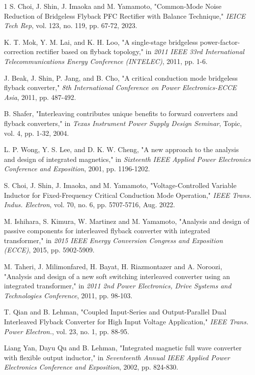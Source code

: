 \documentclass[lettersize,journal]{IEEEtran}
\begin{document}
\begin{thebibliography}{1}
S. Choi, J. Shin, J. Imaoka and M. Yamamoto, "Common-Mode Noise Reduction of Bridgeless Flyback PFC Rectifier with Balance Technique," \textit{IEICE Tech Rep}, vol. 123, no. 119, pp. 67-72, 2023.

K. T. Mok, Y. M. Lai, and K. H. Loo, "A single-stage bridgeless power-factor-correction rectifier based on flyback topology," in \textit{2011 IEEE 33rd International Telecommunications Energy Conference (INTELEC)}, 2011, pp. 1-6.

J. Beak, J. Shin, P. Jang, and B. Cho, "A critical conduction mode bridgeless flyback converter," \textit{8th International Conference on Power Electronics-ECCE Asia}, 2011, pp. 487-492.

B. Shafer, "Interleaving contributes unique benefits to forward converters and flyback converters," in \textit{Texas Instrument Power Supply Design Seminar}, Topic, vol. 4, pp. 1-32, 2004.

L. P. Wong, Y. S. Lee, and D. K. W. Cheng, "A new approach to the analysis and design of integrated magnetics," in \textit{Sixteenth IEEE Applied Power Electronics Conference and Exposition}, 2001, pp. 1196-1202.

S. Choi, J. Shin, J. Imaoka, and M. Yamamoto, "Voltage-Controlled Variable Inductor for Fixed-Frequency Critical Conduction Mode Operation," \textit{IEEE Trans. Indus. Electron}, vol. 70, no. 6, pp. 5707-5716, Aug. 2022.

M. Ishihara, S. Kimura, W. Martinez and M. Yamamoto, "Analysis and design of passive components for interleaved flyback converter with integrated transformer," in \textit{2015 IEEE Energy Conversion Congress and Exposition (ECCE)}, 2015, pp. 5902-5909.

M. Taheri, J. Milimonfared, H. Bayat, H. Riazmontazer and A. Noroozi, "Analysis and design of a new soft switching interleaved converter using an integrated transformer," in \textit{2011 2nd Power Electronics, Drive Systems and Technologies Conference}, 2011, pp. 98-103.

T. Qian and B. Lehman, "Coupled Input-Series and Output-Parallel Dual Interleaved Flyback Converter for High Input Voltage Application," \textit{IEEE Trans. Power Electron.}, vol. 23, no. 1, pp. 88-95.

Liang Yan, Dayu Qu and B. Lehman, "Integrated magnetic full wave converter with flexible output inductor," in \textit{Seventeenth Annual IEEE Applied Power Electronics Conference and Exposition}, 2002, pp. 824-830.


\end{thebibliography}
\end{document}
